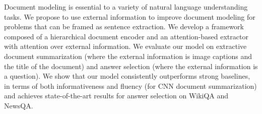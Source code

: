 Document modeling is essential to a variety of natural language understanding tasks. We propose to use external information to improve document modeling for problems that can be framed as sentence extraction. We develop a framework composed of a hierarchical document encoder and an attention-based extractor with attention over external information. We evaluate our model on extractive document summarization (where the external information is image captions and the title of the document) and answer selection (where the external information is a question). We show that our model consistently outperforms strong baselines, in terms of both informativeness and fluency (for CNN document summarization) and achieves state-of-the-art results for answer selection on WikiQA and NewsQA.

